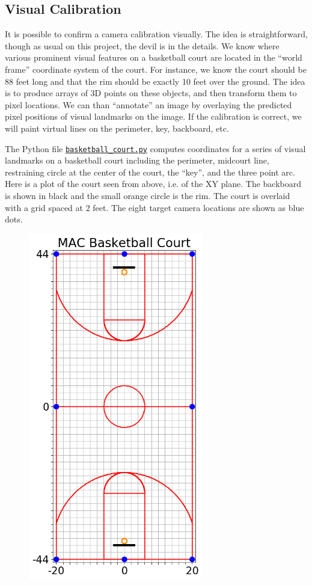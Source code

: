 \documentclass{article}
\begin{document}
\subsection{Visual Calibration}
It is possible to confirm a camera calibration visually.  
The idea is straightforward, though as usual on this project, the devil is in the details.
We know where various prominent visual features on a basketball court are located in the
``world frame'' coordinate system of the court.  
For instance, we know the court should be 88 feet long and that the rim should be exactly 10 feet over the ground.
The idea is to produce arrays of 3D points on these objects, and then transform them to pixel locations.
We can than ``annotate'' an image by overlaying the predicted pixel positions of visual landmarks on the image.
If the calibration is correct, we will paint virtual lines on the perimeter, key, backboard, etc.

The Python file 
 \href{https://github.com/Harvard-AM-205-Basketball/Basketball/blob/master/src/basketball_court.py}
{\texttt{basketball\_court.py}}
computes coordinates for a series of visual landmarks on a
basketball court including the perimeter, midcourt line, restraining circle at the center of the court,
the ``key'', and the three point arc.  Here is a plot of the court seen from above, i.e. of the XY plane.
The backboard is shown in black and the small orange circle is the rim.
The court is overlaid with a grid spaced at 2 feet.  The eight target camera locations are shown as blue dots.
\begin{figure}[H]
\center
\includegraphics[width=0.68\textwidth]{court_lines.png}
\end{figure}
\end{document}
